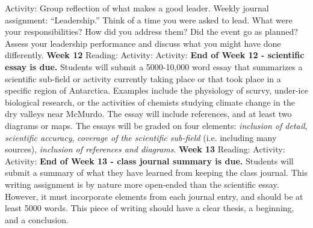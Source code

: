 \documentclass[10pt]{article}
\begin{document}
\begin{outline}[enumerate]
\2 Activity: Group reflection of what makes a good leader.
\2 Weekly journal assignment: ``Leadership.'' Think of a time you were asked to lead.  What were your responsibilities?  How did you address them?  Did the event go as planned?  Assess your leadership performance and discuss what you might have done differently.
\1 \textbf{Week 12}
\2 Reading:
\2 Activity:
\2 Activity:
\1 \textbf{End of Week 12 - scientific essay is due.} Students will submit a 5000-10,000 word essay that summarizes a scientific sub-field or activity currently taking place or that took place in a specific region of Antarctica.  Examples include the physiology of scurvy, under-ice biological research, or the activities of chemists studying climate change in the dry valleys near McMurdo.  The essay will include references, and at least two diagrams or maps.  The essays will be graded on four elements: \textit{inclusion of detail}, \textit{scientific accuracy}, \textit{coverage of the scientific sub-field} (i.e. including many sources), \textit{inclusion of references and diagrams}.
\1 \textbf{Week 13}
\2 Reading:
\2 Activity:
\2 Activity:
\1 \textbf{End of Week 13 - class journal summary is due.} Students will submit a summary of what they have learned from keeping the class journal.  This writing assignment is by nature more open-ended than the scientific essay.  However, it must incorporate elements from each journal entry, and should be at least 5000 words.  This piece of writing should have a clear thesis, a beginning, and a conclusion.
\end{outline}
\end{document}
